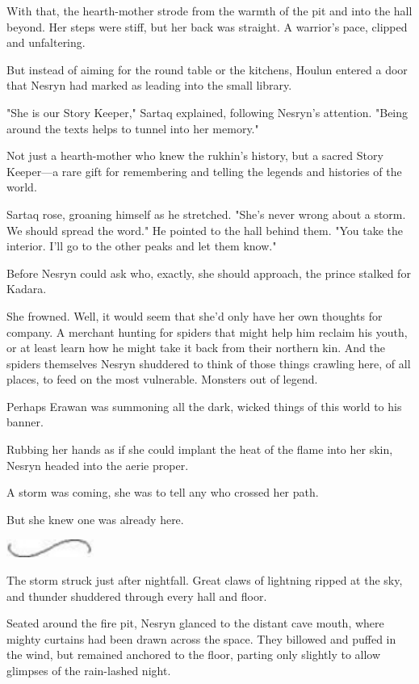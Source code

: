 With that, the hearth-mother strode from the warmth of the pit and into the hall beyond. Her steps were stiff, but her back was straight. A warrior's pace, clipped and unfaltering.

But instead of aiming for the round table or the kitchens, Houlun entered a door that Nesryn had marked as leading into the small library.

"She is our Story Keeper," Sartaq explained, following Nesryn's attention. "Being around the texts helps to tunnel into her memory."

Not just a hearth-mother who knew the rukhin's history, but a sacred Story Keeper---a rare gift for remembering and telling the legends and histories of the world.

Sartaq rose, groaning himself as he stretched. "She's never wrong about a storm. We should spread the word." He pointed to the hall behind them. "You take the interior. I'll go to the other peaks and let them know."

Before Nesryn could ask who, exactly, she should approach, the prince stalked for Kadara.

She frowned. Well, it would seem that she'd only have her own thoughts for company. A merchant hunting for spiders that might help him reclaim his youth, or at least learn how he might take it back from their northern kin. And the spiders themselves  Nesryn shuddered to think of those things crawling here, of all places, to feed on the most vulnerable. Monsters out of legend.

Perhaps Erawan was summoning all the dark, wicked things of this world to his banner.

Rubbing her hands as if she could implant the heat of the flame into her skin, Nesryn headed into the aerie proper.

A storm was coming, she was to tell any who crossed her path.

But she knew one was already here.

\includegraphics[width=1.12in,height=0.24in]{images/seperator}

The storm struck just after nightfall. Great claws of lightning ripped at the sky, and thunder shuddered through every hall and floor.

Seated around the fire pit, Nesryn glanced to the distant cave mouth, where mighty curtains had been drawn across the space. They billowed and puffed in the wind, but remained anchored to the floor, parting only slightly to allow glimpses of the rain-lashed night.

